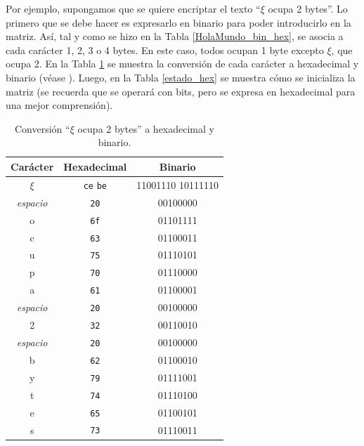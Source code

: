     \noindent Por ejemplo, supongamos que se quiere encriptar el texto ``$\xi$ ocupa 2 bytes''. Lo primero que se debe hacer es expresarlo en binario para poder introducirlo en la matriz. Así, tal y como se hizo en la Tabla \ref{HolaMundo_bin_hex}, se asocia a cada carácter 1, 2, 3 o 4 bytes. En este caso, todos ocupan 1 byte excepto $\xi$, que ocupa 2. En la Tabla \ref{Ksi_bin_hex} se muestra la conversión de cada carácter a hexadecimal y binario (véase \cite{symbl_unicode}). Luego, en la Tabla \ref{estado_hex} se muestra cómo se inicializa la matriz (se recuerda que se operará con bits, pero se expresa en hexadecimal para una mejor comprensión).

    \begin{table}[H]
    \centering
        \begin{tabular}{ccc}
            \hline
            \textbf{Carácter} & \textbf{Hexadecimal} & \textbf{Binario} \\ \hline
            $\xi$ & \texttt{ce} \texttt{be} & 11001110 10111110 \\
            \textit{espacio} & \texttt{20} & 00100000 \\
            o & \texttt{6f} & 01101111 \\
            c & \texttt{63} & 01100011 \\
            u & \texttt{75} & 01110101 \\
            p & \texttt{70} & 01110000 \\
            a & \texttt{61} & 01100001 \\
            \textit{espacio} & \texttt{20} & 00100000 \\
            2 & \texttt{32} & 00110010 \\
            \textit{espacio} & \texttt{20} & 00100000 \\
            b & \texttt{62} & 01100010 \\
            y & \texttt{79} & 01111001 \\
            t & \texttt{74} & 01110100 \\
            e & \texttt{65} & 01100101 \\
            s & \texttt{73} & 01110011 \\ \hline
        \end{tabular}
    \caption{Conversión ``$\xi$ ocupa 2 bytes'' a hexadecimal y binario.}
    \label{Ksi_bin_hex}
    \end{table}
    
    \vspace{-1em}
    
